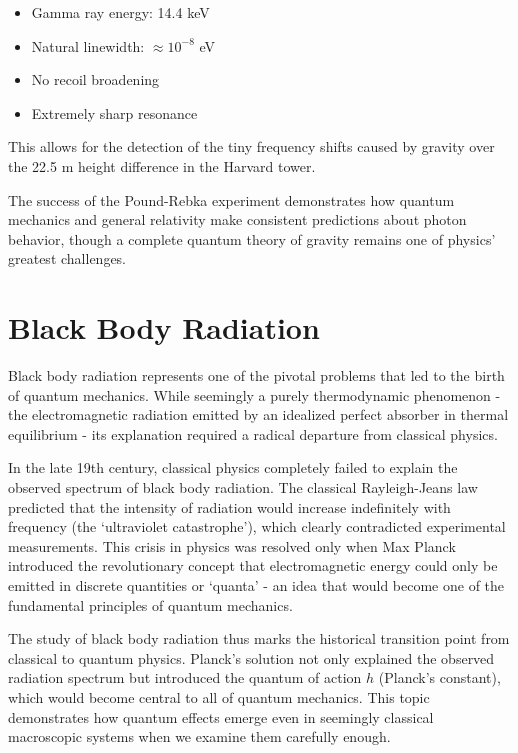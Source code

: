 \documentclass[
  a4paper,
]{book}
\providecommand{\tightlist}{%
  \setlength{\itemsep}{0pt}\setlength{\parskip}{0pt}}
\begin{document}
\begin{tcolorbox}
\begin{itemize}
\tightlist
\item
  Gamma ray energy: 14.4 keV
\item
  Natural linewidth: \(\approx 10^{-8}\) eV
\item
  No recoil broadening
\item
  Extremely sharp resonance
\end{itemize}

This allows for the detection of the tiny frequency shifts caused by
gravity over the 22.5 m height difference in the Harvard tower.

\end{tcolorbox}

The success of the Pound-Rebka experiment demonstrates how quantum
mechanics and general relativity make consistent predictions about
photon behavior, though a complete quantum theory of gravity remains one
of physics' greatest challenges.

\chapter{Black Body Radiation}\label{black-body-radiation-1}

Black body radiation represents one of the pivotal problems that led to
the birth of quantum mechanics. While seemingly a purely thermodynamic
phenomenon - the electromagnetic radiation emitted by an idealized
perfect absorber in thermal equilibrium - its explanation required a
radical departure from classical physics.

In the late 19th century, classical physics completely failed to explain
the observed spectrum of black body radiation. The classical
Rayleigh-Jeans law predicted that the intensity of radiation would
increase indefinitely with frequency (the `ultraviolet catastrophe'),
which clearly contradicted experimental measurements. This crisis in
physics was resolved only when Max Planck introduced the revolutionary
concept that electromagnetic energy could only be emitted in discrete
quantities or `quanta' - an idea that would become one of the
fundamental principles of quantum mechanics.

The study of black body radiation thus marks the historical transition
point from classical to quantum physics. Planck's solution not only
explained the observed radiation spectrum but introduced the quantum of
action \(h\) (Planck's constant), which would become central to all of
quantum mechanics. This topic demonstrates how quantum effects emerge
even in seemingly classical macroscopic systems when we examine them
carefully enough.
\end{document}
